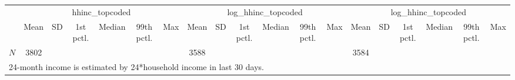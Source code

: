{
\def\sym#1{\ifmmode^{#1}\else\(^{#1}\)\fi}
\begin{tabular}{l*{3}{cccccc}}
\hline\hline
            &\multicolumn{6}{c}{hhinc\_topcoded}                                           &\multicolumn{6}{c}{log\_hhinc\_topcoded}                                       &\multicolumn{6}{c}{log\_hhinc\_topcoded}                                       \\
            &        Mean&          SD&   1st pctl.&      Median&  99th pctl.&         Max&        Mean&          SD&   1st pctl.&      Median&  99th pctl.&         Max&        Mean&          SD&   1st pctl.&      Median&  99th pctl.&         Max\\
\hline
\hline
\(N\)       &        3802&            &            &            &            &            &        3588&            &            &            &            &            &        3584&            &            &            &            &            \\
\hline\hline
\multicolumn{19}{l}{\footnotesize 24-month income is estimated by 24*household income in last 30 days.}\\
\end{tabular}
}
